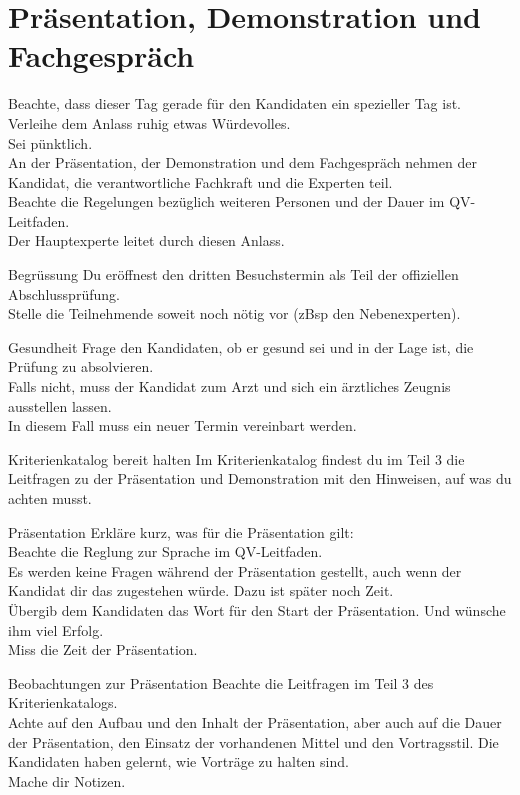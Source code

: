 \section{Präsentation, Demonstration und Fachgespräch}
Beachte, dass dieser Tag gerade für den Kandidaten ein spezieller Tag ist. Verleihe dem Anlass ruhig etwas Würdevolles.\\Sei pünktlich.\\An der Präsentation, der Demonstration und dem Fachgespräch nehmen der Kandidat, die verantwortliche Fachkraft und die Experten
teil.\\Beachte die Regelungen bezüglich weiteren Personen und der Dauer im QV-Leitfaden.\\Der Hauptexperte leitet durch diesen Anlass.
\begin{taskitem}{Begrüssung}
  Du eröffnest den dritten Besuchstermin als Teil der offiziellen Abschlussprüfung.\\Stelle die Teilnehmende soweit noch nötig vor (zBsp den Nebenexperten).
\end{taskitem}
\begin{taskitem}{Gesundheit}
   Frage den Kandidaten, ob er gesund sei und in der Lage ist, die Prüfung zu absolvieren.\\ Falls nicht, muss der Kandidat zum Arzt und sich ein ärztliches Zeugnis ausstellen lassen.\\In diesem Fall muss ein neuer Termin vereinbart werden.
\end{taskitem}
\begin{taskitemwithoutcomment}{Kriterienkatalog bereit halten}
  Im Kriterienkatalog findest du im Teil 3 die Leitfragen zu der Präsentation und Demonstration mit den Hinweisen, auf was du achten musst.
\end{taskitemwithoutcomment}
\newpage
\begin{taskitemwithoutcomment}{Präsentation}
  Erkläre kurz, was für die Präsentation gilt:\\
  Beachte die Reglung zur Sprache im QV-Leitfaden.\\
  Es werden keine Fragen während der Präsentation gestellt, auch wenn der Kandidat dir das zugestehen würde. Dazu ist später noch Zeit.\\Übergib dem Kandidaten das Wort für den Start der Präsentation. Und wünsche ihm viel Erfolg.\\Miss die Zeit der Präsentation.
\end{taskitemwithoutcomment}
\begin{taskitem}{Beobachtungen zur Präsentation}
  Beachte die Leitfragen im Teil 3 des Kriterienkatalogs.\\
  Achte auf den Aufbau und den Inhalt der Präsentation, aber auch auf die Dauer der Präsentation, den Einsatz der vorhandenen Mittel und den Vortragsstil. Die Kandidaten haben gelernt, wie Vorträge zu halten sind.\\
  Mache dir Notizen.
\end{taskitem}
